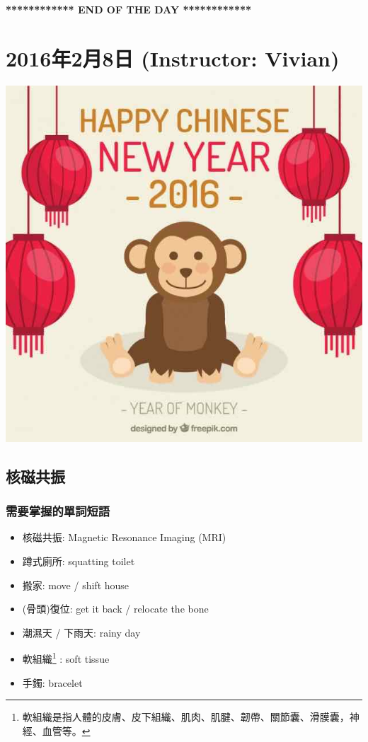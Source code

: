 \vspace{15mm}
\begin{center}
  \textbf{************ END OF THE DAY ************}
\end{center}
\newpage

\section{2016年2月8日 (Instructor: Vivian)}
\begin{center}
  \includegraphics[scale=.7]{pics/happy-year-2016}
\end{center}
\subsection{核磁共振}
\subsubsection*{需要掌握的單詞短語}
\begin{itemize}
  \itemsep0em
  \item 核磁共振: Magnetic Resonance Imaging (MRI)
  \item 蹲式廁所: squatting toilet
  \item 搬家: move / shift house
  \item (骨頭)復位: get it back / relocate the bone
  \item 潮濕天 / 下雨天: rainy day
  \item 軟組織\footnote{軟組織是指人體的皮膚、皮下組織、肌肉、肌腱、韌帶、關節囊、滑膜囊，神經、血管等。} : soft tissue
  \item 手鐲: bracelet
\end{itemize}

